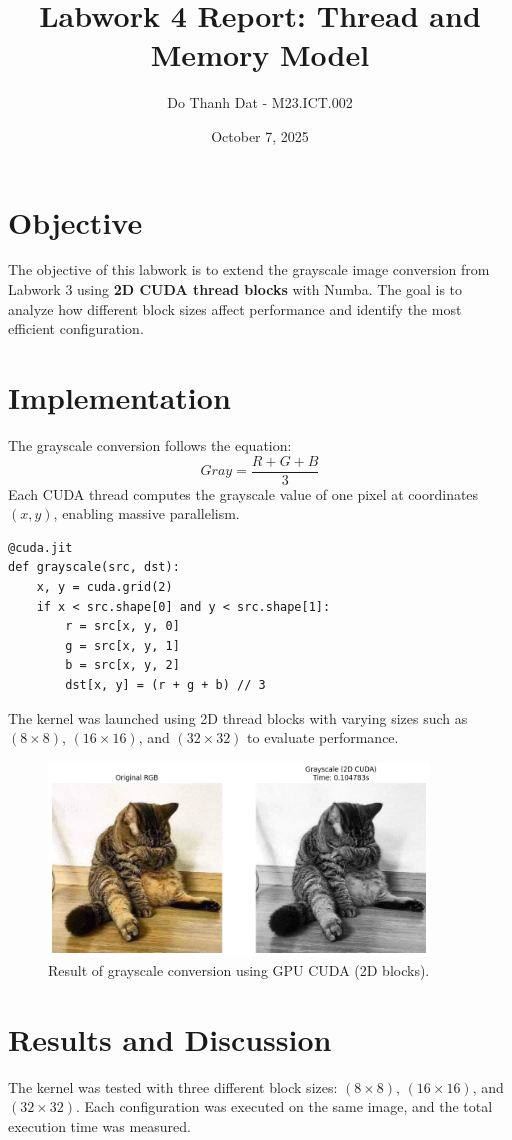 \documentclass[a4paper,12pt]{article}
\title{\textbf{Labwork 4 Report: Thread and Memory Model}}
\author{Do Thanh Dat - M23.ICT.002}
\date{October 7, 2025}
\begin{document}
\maketitle

\section*{Objective}
The objective of this labwork is to extend the grayscale image conversion from Labwork 3 using
\textbf{2D CUDA thread blocks} with Numba.
The goal is to analyze how different block sizes affect performance and identify the most efficient configuration.

\section*{Implementation}
The grayscale conversion follows the equation:
\[
Gray = \frac{R + G + B}{3}
\]
Each CUDA thread computes the grayscale value of one pixel at coordinates $(x, y)$, enabling massive parallelism.

\begin{verbatim}
@cuda.jit
def grayscale(src, dst):
    x, y = cuda.grid(2)
    if x < src.shape[0] and y < src.shape[1]:
        r = src[x, y, 0]
        g = src[x, y, 1]
        b = src[x, y, 2]
        dst[x, y] = (r + g + b) // 3
\end{verbatim}

The kernel was launched using 2D thread blocks with varying sizes such as $(8\times8)$, $(16\times16)$, and $(32\times32)$
to evaluate performance.

\begin{figure}[H]
    \centering
    \includegraphics[width=0.9\textwidth]{image2D.png}
    \caption{Result of grayscale conversion using GPU CUDA (2D blocks).}
\end{figure}

\section*{Results and Discussion}
The kernel was tested with three different block sizes: $(8\times8)$, $(16\times16)$, and $(32\times32)$.
Each configuration was executed on the same image, and the total execution time was measured.
\end{document}
